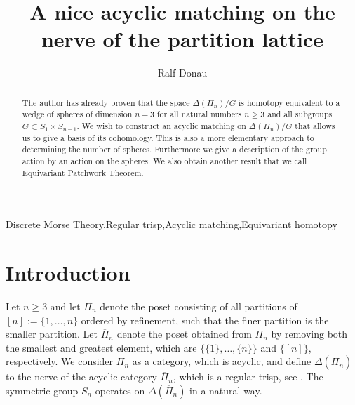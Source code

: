 \documentclass{elsarticle}
\begin{document}
\begin{frontmatter}
\title{A nice acyclic matching on the nerve of the partition lattice}
\author[ruelle]{Ralf Donau}
\address[ruelle]{Fachbereich Mathematik, Universit\"at Bremen, Bibliothekstra\ss e 1, 28359 Bremen, Germany}
\begin{abstract}
The author has already proven that the space $\Delta(\Pi_n)/G$ is homotopy equivalent to a wedge of spheres of dimension $n-3$ for all natural numbers $n\geq 3$ and all subgroups $G\subset S_1\times S_{n-1}$. We wish to construct an acyclic matching on $\Delta(\Pi_n)/G$ that allows us to give a basis of its cohomology. This is also a more elementary approach to determining the number of spheres. Furthermore we give a description of the group action by an action on the spheres. We also obtain another result that we call Equivariant Patchwork Theorem.
\end{abstract}
\begin{keyword}
Discrete Morse Theory\sep Regular trisp\sep Acyclic matching\sep Equivariant homotopy
\end{keyword}
\end{frontmatter}
\section{Introduction}
Let $n\geq 3$ and let $\Pi_n$ denote the poset consisting of all partitions of $[n]:=\{1,\dots,n\}$ ordered by refinement, such that the finer partition is the smaller partition. Let $\overline{\Pi}_n$ denote the poset obtained from $\Pi_n$ by removing both the smallest and greatest element, which are $\{\{1\},\dots,\{n\}\}$ and $\{[n]\}$, respectively. We consider $\overline{\Pi}_n$ as a category, which is acyclic, and define $\Delta(\overline{\Pi}_n)$ to the nerve of the acyclic category $\overline{\Pi}_n$, which is a regular trisp, see \cite[Chapter 10]{buch}. The symmetric group $S_n$ operates on $\Delta(\overline{\Pi}_n)$ in a natural way.
\end{document}
